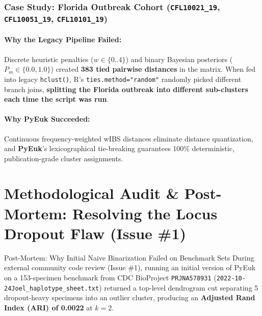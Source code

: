 \documentclass[11pt,a4paper]{article}
\begin{document}
\subsubsection{Case Study: Florida Outbreak Cohort (\texttt{CFL10021\_19}, \texttt{CFL10051\_19}, \texttt{CFL10101\_19})}
\paragraph{Why the Legacy Pipeline Failed:}
Discrete heuristic penalties ($w \in \{0..4\}$) and binary Bayesian posteriors ($P_m \in \{0.0, 1.0\}$) created \textbf{383 tied pairwise distances} in the matrix. When fed into legacy \texttt{hclust()}, R's \texttt{ties.method="random"} randomly picked different branch joins, \textbf{splitting the Florida outbreak into different sub-clusters each time the script was run}.

\paragraph{Why PyEuk Succeeded:}
Continuous frequency-weighted wIBS distances eliminate distance quantization, and \textbf{PyEuk}'s lexicographical tie-breaking guarantees 100\% deterministic, publication-grade cluster assignments.

\section{Methodological Audit \& Post-Mortem: Resolving the Locus Dropout Flaw (Issue \#1)}

\begin{warningbox}{Post-Mortem: Why Initial Naive Binarization Failed on Benchmark Sets}
During external community code review (Issue \#1), running an initial version of PyEuk on a 153-specimen benchmark from CDC BioProject \texttt{PRJNA578931} (\texttt{2022-10-24Joel\_haplotype\_sheet.txt}) returned a top-level dendrogram cut separating 5 dropout-heavy specimens into an outlier cluster, producing an \textbf{Adjusted Rand Index (ARI) of 0.0022} at $k=2$.
\end{warningbox}
\end{document}
